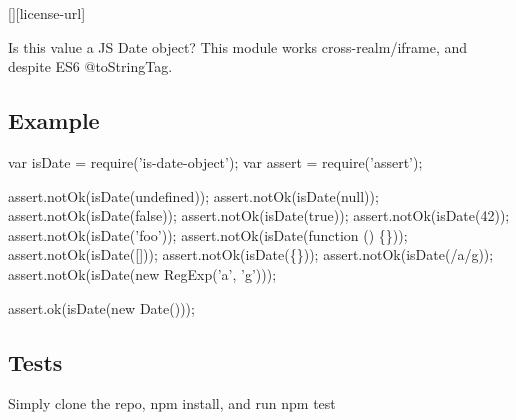 \href{https://travis-ci.org/ljharb/is-date-object}{\tt } \href{https://david-dm.org/ljharb/is-date-object}{\tt } \href{https://david-dm.org/ljharb/is-date-object#info=devDependencies}{\tt } \mbox{[}\mbox{]}\mbox{[}license-\/url\mbox{]} \href{http://npm-stat.com/charts.html?package=is-date-object}{\tt }

\href{https://npmjs.org/package/is-date-object}{\tt }

\href{https://ci.testling.com/ljharb/is-date-object}{\tt }

Is this value a JS Date object? This module works cross-\/realm/iframe, and despite E\+S6 @to\+String\+Tag.

\subsection*{Example}


\begin{DoxyCode}
var isDate = require('is-date-object');
var assert = require('assert');

assert.notOk(isDate(undefined));
assert.notOk(isDate(null));
assert.notOk(isDate(false));
assert.notOk(isDate(true));
assert.notOk(isDate(42));
assert.notOk(isDate('foo'));
assert.notOk(isDate(function () \{\}));
assert.notOk(isDate([]));
assert.notOk(isDate(\{\}));
assert.notOk(isDate(/a/g));
assert.notOk(isDate(new RegExp('a', 'g')));

assert.ok(isDate(new Date()));
\end{DoxyCode}


\subsection*{Tests}

Simply clone the repo, {\ttfamily npm install}, and run {\ttfamily npm test} 